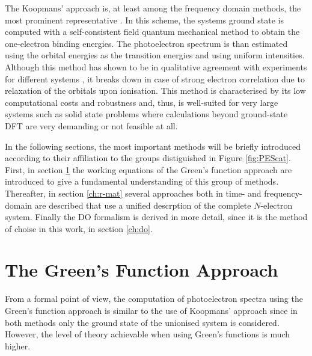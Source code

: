 The Koopmans' approach is, at least among the frequency domain methods, the most prominent representative \cite{Koerzd1,PottsHolland,dos,dos2}.
In this scheme, the systems ground state is computed with a self-consistent field quantum mechanical method to obtain the one-electron binding energies.
The photoelectron spectrum is than estimated using the orbital energies as the transition energies and using uniform intensities.
Although this method has shown to be in qualitative agreement with experiments for different systems \cite{Koerzd1,Koerzd2, EggerKronik,PottsHolland,YepesJaque}, it breaks down in case of strong electron correlation \cite{2phcederbaum,2phcederbaum2} due to relaxation of the orbitals upon ionisation.
This method is characterised by its low computational costs and robustness and, thus, is well-suited for very large systems such as solid state problems where calculations beyond ground-state DFT are very demanding or not feasible at all.

In the following sections, the most important methods will be briefly introduced according to their affiliation to the groups distiguished in Figure \ref{fig:PEScat}.
First, in section \ref{ch:gf} the working equations of the Green's function approach are introduced to give a fundamental understanding of this group of methods.
Thereafter, in section \ref{ch:r-mat} several approaches both in time- and frequency-domain are described that use a unified descrption of the complete $N$-electron system.
Finally the DO formalism is derived in more detail, since it is the method of choise in this work, in section \ref{ch:do}.

\section{The Green's Function Approach}
\label{ch:gf}
From a formal point of view, the computation of photoelectron spectra using the Green's function approach is similar to the use of Koopmans' approach since in both methods only the ground state of the unionised system is considered.
However, the level of theory achievable when using Green's functions is much higher.

